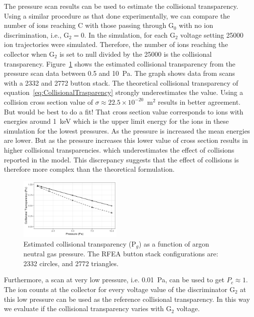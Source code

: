 The pressure scan results can be used to estimate the collisional transparency. Using a similar procedure as that done experimentally, we can compare the number of ions reaching C with those passing through G$_0$ with no ion discrimination, i.e., G$_2 =0$. In the simulation, for each G$_2$ voltage setting 25000 ion trajectories were simulated. Therefore, the number of ions reaching the collector when G$_2$ is set to null divided by the 25000 is the collisional transparency. Figure~\ref{fig:CollisionalTransparency} shows the estimated collisional transparency from the pressure scan data between 0.5 and 10~Pa. The graph shows data from scans with a 2332 and 2772 button stack. The theoretical collisional transparency of equation~\ref{eq:CollisionalTrasparency} strongly underestimates the value. Using a collision cross section value of $\sigma \approx 22.5 \times 10^{-20}$~m$^2$ results in better agreement. But would be best to do a fit! That cross section value corresponds to ions with energies around 1~keV which is the upper limit energy for the ions in these simulation for the lowest pressures. As the pressure is increased the mean energies are lower. But as the pressure increases this lower value of cross section results in higher collisional transparencies. which underestimates the effect of collisions reported in the model. This discrepancy suggests that the effect of collisions is therefore more complex than the theoretical formulation.     

\begin{figure}[htbp]
\centering
\includegraphics[width=0.45\textwidth]{Figures/CollisionalTransparency.jpeg}
\caption{Estimated collisional transparency (P$_g$) as a function of argon neutral gas pressure. The RFEA button stack configurations are: 2332 circles, and 2772 triangles.}
\label{fig:CollisionalTransparency}
\end{figure}

Furthermore, a scan at very low pressure, i.e. 0.01~Pa, can be used to get $P_c \approx 1$. The ion counts at the collector for every voltage value of the discriminator G$_2$ at this low pressure can be used as the reference collisional transparency. In this way we evaluate if the collisional transparency varies with G$_2$ voltage. 